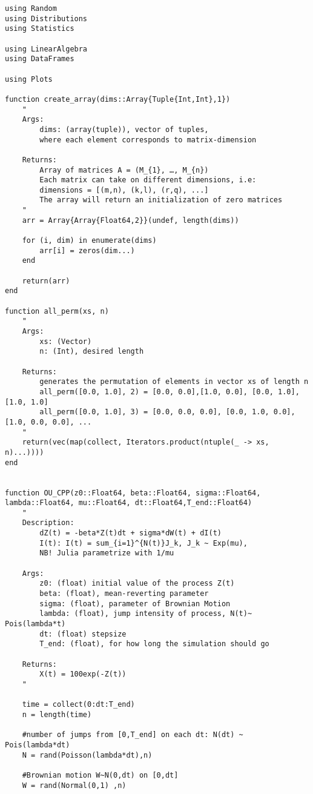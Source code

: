 \begin{verbatim}
using Random 
using Distributions
using Statistics

using LinearAlgebra
using DataFrames

using Plots

function create_array(dims::Array{Tuple{Int,Int},1})
    "
    Args: 
        dims: (array(tuple)), vector of tuples, 
        where each element corresponds to matrix-dimension
    
    Returns:
        Array of matrices A = (M_{1}, …, M_{n})
        Each matrix can take on different dimensions, i.e:
        dimensions = [(m,n), (k,l), (r,q), ...] 
        The array will return an initialization of zero matrices  
    "
    arr = Array{Array{Float64,2}}(undef, length(dims))

    for (i, dim) in enumerate(dims)
        arr[i] = zeros(dim...)
    end

    return(arr)
end

function all_perm(xs, n)
    " 
    Args: 
        xs: (Vector)
        n: (Int), desired length
    
    Returns:
        generates the permutation of elements in vector xs of length n
        all_perm([0.0, 1.0], 2) = [0.0, 0.0],[1.0, 0.0], [0.0, 1.0], [1.0, 1.0]
        all_perm([0.0, 1.0], 3) = [0.0, 0.0, 0.0], [0.0, 1.0, 0.0], [1.0, 0.0, 0.0], ...
    "
    return(vec(map(collect, Iterators.product(ntuple(_ -> xs, n)...))))
end 


function OU_CPP(z0::Float64, beta::Float64, sigma::Float64, lambda::Float64, mu::Float64, dt::Float64,T_end::Float64)
    " 
    Description:
        dZ(t) = -beta*Z(t)dt + sigma*dW(t) + dI(t)
        I(t): I(t) = sum_{i=1}^{N(t)}J_k, J_k ~ Exp(mu), 
        NB! Julia parametrize with 1/mu

    Args:    
        z0: (float) initial value of the process Z(t)
        beta: (float), mean-reverting parameter
        sigma: (float), parameter of Brownian Motion
        lambda: (float), jump intensity of process, N(t)~ Pois(lambda*t) 
        dt: (float) stepsize 
        T_end: (float), for how long the simulation should go
     
    Returns: 
        X(t) = 100exp(-Z(t))
    "

    time = collect(0:dt:T_end) 
    n = length(time)

    #number of jumps from [0,T_end] on each dt: N(dt) ~ Pois(lambda*dt)
    N = rand(Poisson(lambda*dt),n) 

    #Brownian motion W~N(0,dt) on [0,dt]
    W = rand(Normal(0,1) ,n)


\end{verbatim}
